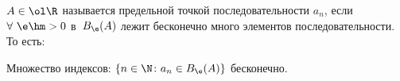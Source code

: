
$A\in\ol\R$ называется предельной точкой последовательности $a_n$, если
$\forall\  \e\hm>0$ в~$B_\e(A)$ лежит бесконечно много элементов последовательности. То есть:

Множество индексов: $\{n\in\N\colon a_n\in B_\e(A)\}$ бесконечно.
